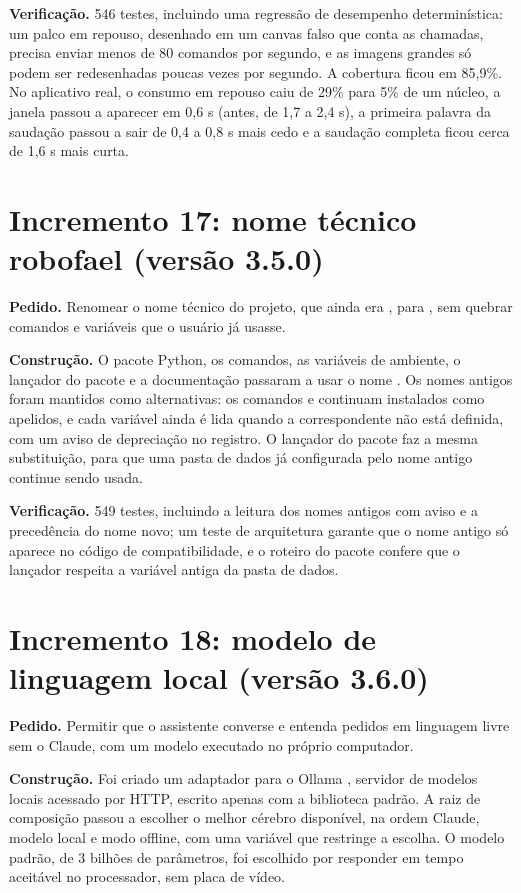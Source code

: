 \textbf{Verificação.} 546 testes, incluindo uma regressão de desempenho determinística: um palco em
repouso, desenhado em um canvas falso que conta as chamadas, precisa enviar menos de 80 comandos por
segundo, e as imagens grandes só podem ser redesenhadas poucas vezes por segundo. A cobertura ficou em
85,9\%. No aplicativo real, o consumo em repouso caiu de 29\% para 5\% de um núcleo, a janela passou a
aparecer em 0,6 s (antes, de 1,7 a 2,4 s), a primeira palavra da saudação passou a sair de 0,4 a 0,8 s
mais cedo e a saudação completa ficou cerca de 1,6 s mais curta.

\section{Incremento 17: nome técnico robofael (versão 3.5.0)}

\textbf{Pedido.} Renomear o nome técnico do projeto, que ainda era , para ,
sem quebrar comandos e variáveis que o usuário já usasse.

\textbf{Construção.} O pacote Python, os comandos, as variáveis de ambiente, o lançador do pacote
 e a documentação passaram a usar o nome . Os nomes antigos foram mantidos como
alternativas: os comandos  e  continuam instalados como apelidos, e
cada variável  ainda é lida quando a  correspondente não está definida,
com um aviso de depreciação no registro. O lançador do pacote faz a mesma substituição, para que uma
pasta de dados já configurada pelo nome antigo continue sendo usada.

\textbf{Verificação.} 549 testes, incluindo a leitura dos nomes antigos com aviso e a precedência do
nome novo; um teste de arquitetura garante que o nome antigo só aparece no código de compatibilidade, e
o roteiro do pacote confere que o lançador respeita a variável antiga da pasta de dados.

\section{Incremento 18: modelo de linguagem local (versão 3.6.0)}

\textbf{Pedido.} Permitir que o assistente converse e entenda pedidos em linguagem livre sem o Claude,
com um modelo executado no próprio computador.

\textbf{Construção.} Foi criado um adaptador para o Ollama \cite{ollama}, servidor de modelos locais
acessado por HTTP, escrito apenas com a biblioteca padrão. A raiz de composição passou a escolher o
melhor cérebro disponível, na ordem Claude, modelo local e modo offline, com uma variável que restringe
a escolha. O modelo padrão, de 3 bilhões de parâmetros, foi escolhido por responder em tempo aceitável
no processador, sem placa de vídeo.

